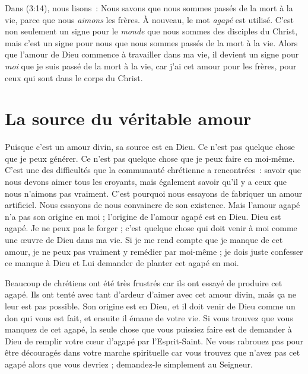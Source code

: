 Dans (3:14), nous lisons~:
 \og Nous savons que nous sommes passés de la mort à la vie,
 parce que nous \emph{aimons} les frères. \fg{}
 À nouveau, le mot \emph{agapé} est utilisé.
 C'est non seulement un signe pour le \emph{monde}
 que nous sommes des disciples du Christ, mais c'est un signe pour nous
 que nous sommes passés de la mort à la vie.
 Alors que l'amour de Dieu commence à travailler dans ma vie,
 il devient un signe pour \emph{moi} que je suis passé de la mort à la vie,
 car j'ai cet amour pour les frères, pour ceux qui sont
 dans le corps du Christ.


\section*{La source du véritable amour}

Puisque c'est un amour divin, sa source est en Dieu.
 Ce n'est pas quelque chose que je peux générer.
 Ce n'est pas quelque chose que je peux faire en moi-même.
 C'est une des difficultés que la communauté chrétienne a rencontrées~:
 savoir que nous devons aimer tous les croyants, mais également savoir
 qu'il y a ceux que nous n'aimons pas vraiment.
 C'est pourquoi nous essayons de fabriquer un amour artificiel.
 Nous essayons de nous convaincre de son existence.
 Mais l'amour agapé n'a pas son origine en moi ;
 l'origine de l'amour agapé est en Dieu. Dieu est agapé.
 Je ne peux pas le forger ; c'est quelque chose qui doit venir à moi
 comme une œuvre de Dieu dans ma vie.
 Si je me rend compte que je manque de cet amour, je ne peux pas vraiment
 y remédier par moi-même ; je dois juste confesser ce manque à Dieu
 et Lui demander de planter cet agapé en moi.

Beaucoup de chrétiens ont été très frustrés car ils ont essayé
 de produire cet agapé.
 Ils ont tenté avec tant d'ardeur d'aimer avec cet amour divin,
 mais ça ne leur est pas possible. Son origine est en Dieu,
 et il doit venir de Dieu comme un don qui vous est fait,
 et ensuite il émane de votre vie. Si vous trouvez que vous manquez
 de cet agapé, la seule chose que vous puissiez faire est de demander à Dieu
 de remplir votre cœur d'agapé par l'Esprit-Saint.
 Ne vous rabrouez pas pour être découragés dans votre marche spirituelle
 car vous trouvez que n'avez pas cet agapé alors que vous devriez ;
 demandez-le simplement au Seigneur.


